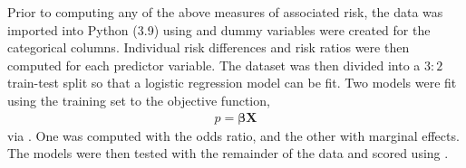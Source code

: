 Prior to computing any of the above measures of associated risk, the data was imported into Python (3.9) using  and dummy variables were created for the categorical columns.
Individual risk differences and risk ratios were then computed for each predictor variable.
The dataset was then divided into a $3:2$ train-test split so that a logistic regression model can be fit.
Two models were fit using the training set to the objective function,
\begin{align*}
    p = \boldsymbol{\beta X}
\end{align*}
via .
One was computed with the odds ratio, and the other with marginal effects.
The models were then tested with the remainder of the data and scored using .

